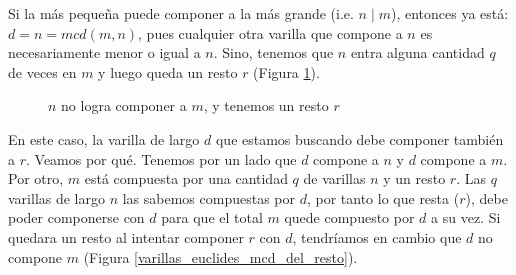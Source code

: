 \documentclass[12pt, a4paper, openany, fleqn]{book}
\begin{document}
    Si la más pequeña puede componer a la más grande (i.e. $n \mid m$), entonces ya está: $d=n=mcd(m,n)$, pues cualquier otra varilla que compone a $n$ es necesariamente menor o igual a $n$. Sino, tenemos que $n$ entra alguna cantidad $q$ de veces en $m$ y luego queda un resto $r$ (Figura \ref{varillas_euclides_resto}).

    \begin{figure}[h]
        \centering
        \caption{$n$ no logra componer a $m$, y tenemos un resto $r$} \label{varillas_euclides_resto}
    \end{figure}


    En este caso, la varilla de largo $d$ que estamos buscando debe componer también a $r$. Veamos por qué. Tenemos por un lado que $d$ compone a $n$ y $d$ compone a $m$. Por otro, $m$ está compuesta por una cantidad $q$ de varillas $n$ y un resto $r$.
    Las $q$ varillas de largo $n$ las sabemos compuestas por $d$, por tanto lo que resta ($r$), debe poder componerse con $d$ para que el total $m$ quede compuesto por $d$ a su vez. Si quedara un resto al intentar componer $r$ con $d$, tendríamos en cambio que $d$ no compone $m$ (Figura \ref{varillas_euclides_mcd_del_resto}).
\end{document}
